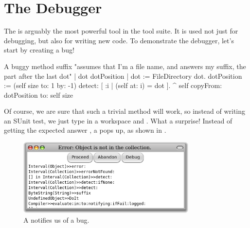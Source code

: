 \documentclass[a4paper,10pt,twoside]{book}
\begin{document}
%

\section{The Debugger}

The  is arguably the most powerful tool in the \pharo tool suite.  It is used not just for debugging, but also for writing new code.
To demonstrate the debugger, let's start by creating a bug!


\begin{method}[buggy]{A buggy method}
suffix
	"assumes that I'm a file name, and answers my suffix, the part after the last dot"
	| dot dotPosition |
	dot := FileDirectory dot.
	dotPosition := (self size to: 1 by: -1) detect: [ :i | (self at: i) = dot ].
	^ self copyFrom: dotPosition to: self size 
\end{method}

Of course, we are sure that such a trivial method will work, so instead of writing an SUnit test, we just type
 in a workspace and .
What a surprise!  Instead of getting the expected answer , a  pops up, as shown in .

\begin{figure}[btp]
	\begin{center}
	\includegraphics[width=0.8\textwidth]{PreDebugWindow}
	\end{center}
	\caption{A  notifies us of a bug.}
\end{figure}
\end{document}
